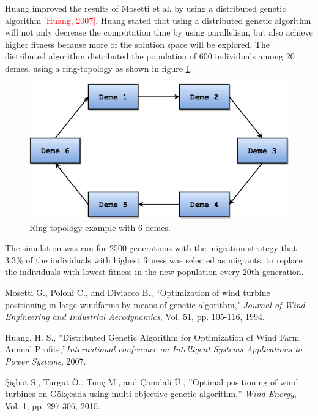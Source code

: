 \documentclass{article}
\begin{document}
\noindent Huang improved the results of Mosetti et al. by using a distributed genetic algorithm \textcolor{red}{[Huang, 2007]}. Huang stated that using a distributed genetic algorithm will not only decrease the computation time by using parallelism, but also achieve higher fitness because more of the solution space will be explored. The distributed algorithm distributed the population of 600 individuals among 20 demes, using a ring-topology as shown in figure \ref{Ring Topology}.


\begin{figure}[h!]
\begin{center}
\includegraphics[scale=0.3]{"Ring Topology"}
\caption{Ring topology example with 6 demes.}
\label{Ring Topology}
\end{center}
\end{figure}


The simulation was run for 2500 generations with the migration strategy that 3.3\% of the individuals with highest fitness was selected as migrants, to replace the individuals with lowest fitness in the new population every 20th generation.


\begin{thebibliography}{100} %

 Mosetti G., Poloni C., and Diviacco B., ``Optimization of wind turbine positioning in large windfarms by means of genetic algorithm," \emph{Journal of Wind Engineering and Industrial Aerodynamics}, Vol. 51, pp. 105-116, 1994.

 Huang, H. S., ''Distributed Genetic Algorithm for Optimization of Wind Farm Annual Profits,''\emph{International conference on Intelligent Systems Applications to Power Systems}, 2007.

 \c{S}i\c{s}bot S., Turgut {\"O}., Tun\c{c} M., and \c{C}amdali {\"U}., ''Optimal positioning of wind turbines on G{\"o}k\c{c}eada using multi-objective genetic algorithm,'' \emph{Wind Energy}, Vol. 1, pp. 297-306, 2010.

\end{thebibliography}
\end{document}
